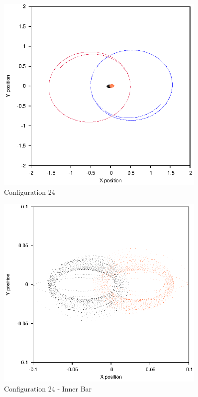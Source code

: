 \documentclass[a4paper,12pt]{article}
\begin{document}
\begin{figure}[H]
\centering
\includegraphics[width=0.9\textwidth]{./2017results/1-1-1-03/Orbit.eps}
\caption{Configuration 24}
\label{fig:config24}
\end{figure}
\begin{figure}[H]
\centering
\includegraphics[width=0.9\textwidth]{./2017results/1-1-1-03/Inner.eps}
\caption{Configuration 24 - Inner Bar}
\label{fig:config24i}
\end{figure}
\end{document}
